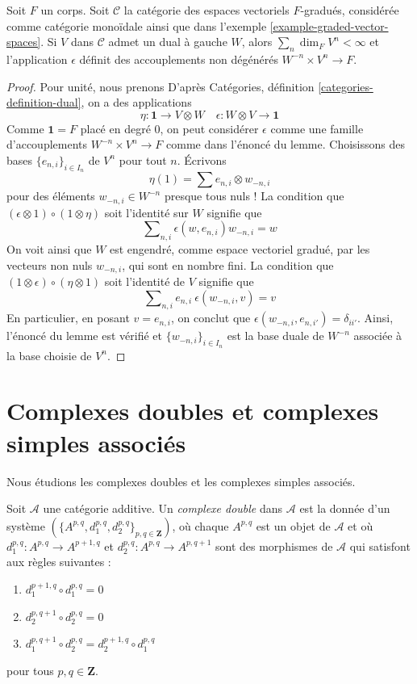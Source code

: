 \begin{lemma}
\label{lemma-left-dual-graded-vector-spaces}
Soit $F$ un corps. Soit $\mathcal{C}$ la catégorie des espaces vectoriels
$F$-gradués, considérée comme catégorie monoïdale ainsi que dans
l'exemple \ref{example-graded-vector-spaces}. Si $V$ dans $\mathcal{C}$
admet un dual à gauche $W$, alors $\sum_n \dim_F V^n < \infty$
et l'application $\epsilon$ définit des accouplements non dégénérés
$W^{-n} \times V^n \to F$.
\end{lemma}

\begin{proof}
Pour unité, nous prenons
D'après Catégories, définition \ref{categories-definition-dual}, on a des
applications
$$
\eta : \mathbf{1} \to V \otimes W\quad
\epsilon : W \otimes V \to \mathbf{1}
$$
Comme $\mathbf{1} = F$ placé en degré $0$, on peut
considérer $\epsilon$ comme une famille d'accouplements
$W^{-n} \times V^n \to F$ comme dans l'énoncé du lemme.
Choisissons des bases $\{e_{n, i}\}_{i \in I_n}$ de $V^n$ pour tout $n$.
Écrivons
$$
\eta(1) = \sum e_{n, i} \otimes w_{-n, i}
$$
pour des éléments $w_{-n, i} \in W^{-n}$ presque tous nuls !
La condition que $(\epsilon \otimes 1) \circ (1 \otimes \eta)$ soit
l'identité sur $W$ signifie que
$$
\sum\nolimits_{n, i} \epsilon(w, e_{n, i})w_{-n, i} = w
$$
On voit ainsi que $W$ est engendré, comme espace vectoriel gradué,
par les vecteurs non nuls $w_{-n, i}$, qui sont en nombre fini.
La condition que $(1 \otimes \epsilon) \circ (\eta \otimes 1)$
soit l'identité de $V$ signifie que
$$
\sum\nolimits_{n, i} e_{n, i}\ \epsilon(w_{-n, i}, v) = v
$$
En particulier, en posant $v = e_{n, i}$, on conclut que
$\epsilon(w_{-n, i}, e_{n, i'}) = \delta_{ii'}$. Ainsi,
l'énoncé du lemme est vérifié et
$\{w_{-n, i}\}_{i \in I_n}$ est la base duale de $W^{-n}$ associée à
la base choisie de $V^n$.
\end{proof}
\section{Complexes doubles et complexes simples associés}
\label{section-double-complexes}

\noindent
Nous étudions les complexes doubles et les complexes simples associés.

\begin{definition}
\label{definition-double-complex}
Soit $\mathcal{A}$ une catégorie additive.
Un {\it complexe double} dans $\mathcal{A}$ est la donnée
d'un système $(\{A^{p, q}, d_1^{p, q}, d_2^{p, q}\}_{p, q\in \mathbf{Z}})$,
où chaque $A^{p, q}$ est un objet de $\mathcal{A}$ et où
$d_1^{p, q} : A^{p, q} \to A^{p + 1, q}$ et
$d_2^{p, q} : A^{p, q} \to A^{p, q + 1}$ sont des morphismes de $\mathcal{A}$
qui satisfont aux règles suivantes :
\begin{enumerate}
\item $d_1^{p + 1, q} \circ d_1^{p, q} = 0$
\item $d_2^{p, q + 1} \circ d_2^{p, q} = 0$
\item $d_1^{p, q + 1} \circ d_2^{p, q} = d_2^{p + 1, q} \circ d_1^{p, q}$
\end{enumerate}
pour tous $p, q \in \mathbf{Z}$.
\end{definition}

